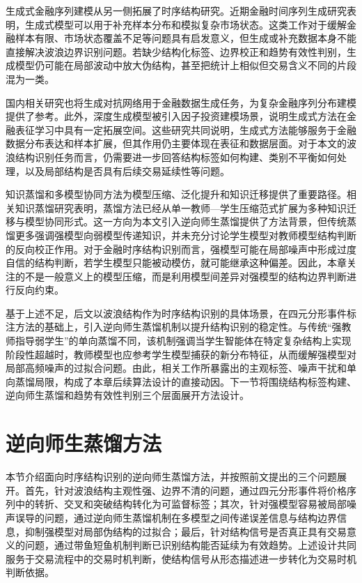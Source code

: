 生成式金融序列建模从另一侧拓展了时序结构研究。近期金融时间序列生成研究表明，生成式模型可以用于补充样本分布和模拟复杂市场状态\cite{vuletic2024fin}。这类工作对于缓解金融样本有限、市场状态覆盖不足等问题具有启发意义，但生成或补充数据本身不能直接解决波浪边界识别问题。若缺少结构化标签、边界校正和趋势有效性判别，生成模型仍可能在局部波动中放大伪结构，甚至把统计上相似但交易含义不同的片段混为一类。

国内相关研究也将生成对抗网络用于金融数据生成任务，为复杂金融序列分布建模提供了参考\cite{cui20241gan}。此外，深度生成模型被引入因子投资建模场景，说明生成式方法在金融表征学习中具有一定拓展空间\cite{ma2022deep}。这些研究共同说明，生成式方法能够服务于金融数据分布表达和样本扩展，但其作用仍主要体现在表征和数据层面。对于本文的波浪结构识别任务而言，仍需要进一步回答结构标签如何构建、类别不平衡如何处理，以及局部结构是否具有后续交易延续性等问题。

知识蒸馏和多模型协同方法为模型压缩、泛化提升和知识迁移提供了重要路径。相关知识蒸馏研究表明，蒸馏方法已经从单一教师—学生压缩范式扩展为多种知识迁移与模型协同形式\cite{huang2022distillation}。这一方向为本文引入逆向师生蒸馏提供了方法背景，但传统蒸馏更多强调强模型向弱模型传递知识，并未充分讨论学生模型对教师模型结构判断的反向校正作用。对于金融时序结构识别而言，强模型可能在局部噪声中形成过度自信的结构判断，若学生模型只能被动模仿，就可能继承这种偏差。因此，本章关注的不是一般意义上的模型压缩，而是利用模型间差异对强模型的结构边界判断进行反向约束。

基于上述不足，后文以波浪结构作为时序结构识别的具体场景，在四元分形事件标注方法的基础上，引入逆向师生蒸馏机制以提升结构识别的稳定性。与传统``强教师指导弱学生''的单向蒸馏不同，该机制强调当学生智能体在特定复杂结构上实现阶段性超越时，教师模型也应参考学生模型捕获的新分布特征，从而缓解强模型对局部高频噪声的过拟合问题。由此，相关工作所暴露出的主观标签、噪声干扰和单向蒸馏局限，构成了本章后续算法设计的直接动因。下一节将围绕结构标签构建、逆向师生蒸馏和趋势有效性判别三个层面展开方法设计。

\section{逆向师生蒸馏方法}

本节介绍面向时序结构识别的逆向师生蒸馏方法，并按照前文提出的三个问题展开。首先，针对波浪结构主观性强、边界不清的问题，通过四元分形事件将价格序列中的转折、交叉和突破结构转化为可监督标签；其次，针对强模型容易被局部噪声误导的问题，通过逆向师生蒸馏机制在多模型之间传递误差信息与结构边界信息，抑制强模型对局部伪结构的过拟合；最后，针对结构信号是否真正具有交易意义的问题，通过带鱼短鱼机制判断已识别结构能否延续为有效趋势。上述设计共同服务于交易流程中的交易时机判断，使结构信号从形态描述进一步转化为交易时机判断依据。

